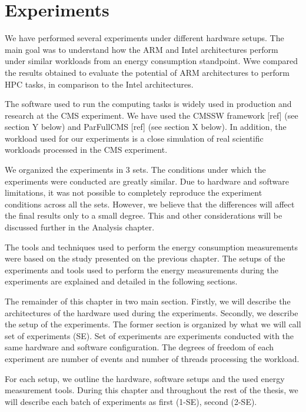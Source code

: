 \chapter{Experiments}


We have performed several experiments under different hardware setups. 
The main goal was to understand how the ARM and Intel architectures
perform under similar workloads from an energy
consumption standpoint. Wwe compared the results
obtained to evaluate the potential of ARM architectures to perform HPC tasks, in
comparison to the Intel architectures.

The software used to run the computing tasks is
widely used in production and research at the CMS experiment. We have used the
CMSSW framework [ref] (see section Y below) and ParFullCMS [ref] (see section X
below). In addition, the workload used for our experiments is a close
simulation of real scientific workloads processed in the CMS experiment.

We organized the experiments in 3 sets. The conditions under which the
experiments were conducted are greatly similar. Due to hardware and software
limitations, it was not possible to completely reproduce the experiment
conditions across all the sets. However, we believe that the differences will
affect the final results only to a small degree. This and other considerations
will be discussed further in the Analysis chapter. 

The tools and techniques used to perform the energy
consumption measurements were based on the study presented on the previous
chapter. The setups of the experiments and tools used to perform the energy
measurements during the experiments are explained and detailed in the following
sections.

The remainder of this chapter in two main section. Firstly, we will describe the
architectures of the hardware used during the experiments.  Secondly, we describe
the setup of the experiments. The former section is organized by what we will
call set of experiments (SE). Set of experiments are experiments conducted with
the same hardware and software configuration. The degrees of freedom of each
experiment are number of events and number of threads processing the workload.
 
For each setup, we outline the hardware, software setups and the used energy measurement tools. 
During this chapter and throughout the rest of the thesis, we will describe
each batch of experiments as first (1-SE), 
second (2-SE).


